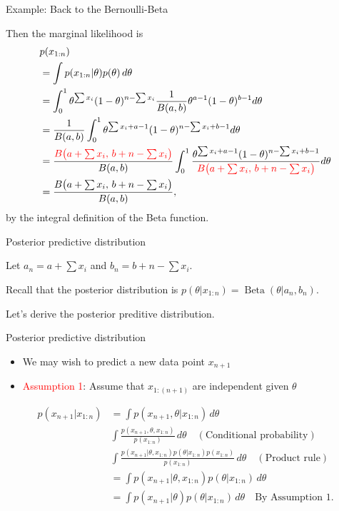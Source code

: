 \documentclass[
  ignorenonframetext,
]{beamer}
\providecommand{\tightlist}{%
  \setlength{\itemsep}{0pt}\setlength{\parskip}{0pt}}
\DeclareMathOperator*{\Beta}{Beta}
\begin{document}
\begin{frame}{Example: Back to the Bernoulli-Beta}
\protect\hypertarget{example-back-to-the-bernoulli-beta-1}{}

Then the marginal likelihood is \[
\begin{aligned}
&p(x_{1:n}) \\
&= \int p(x_{1:n}|\theta) p(\theta) \,d\theta\\
& = \int_0^1\theta^{\sum x_i}(1-\theta)^{n-\sum x_i}\frac{1}{B(a,b)}\theta^{a-1}(1-\theta)^{b-1} d\theta\\
& = \frac{1}{B(a,b)}\int_0^1\theta^{\sum x_i+a-1}(1-\theta)^{n-\sum x_i+b-1} 
d\theta\\
& = \frac{\textcolor{red}{B\big(a +\sum x_i,\, b + n-\sum x_i\big)}}{B(a,b)}\int_0^1 \frac{\theta^{\sum x_i+a-1}(1-\theta)^{n-\sum x_i+b-1}}{\textcolor{red}{B\big(a +\sum x_i,\, b + n-\sum x_i\big)}}
d\theta\\
& =\frac{B\big(a +\sum x_i,\, b + n-\sum x_i\big)}{B(a,b)},
\end{aligned}
\] by the integral definition of the Beta function.

\end{frame}

\begin{frame}{Posterior predictive distribution}
\protect\hypertarget{posterior-predictive-distribution}{}

Let \(a_n = a +\sum x_i\) and \(b_n = b + n-\sum x_i.\)

Recall that the posterior distribution is
\(p(\theta|x_{1:n}) = \Beta(\theta|a_n,b_n).\)

Let's derive the posterior preditive distribution.

\end{frame}

\begin{frame}{Posterior predictive distribution}
\protect\hypertarget{posterior-predictive-distribution-1}{}

\begin{itemize}
\tightlist
\item
  We may wish to predict a new data point \(x_{n+1}\)
\item
  \textcolor{red}{Assumption 1}: Assume that \(x_{1:(n+1)}\) are
  independent given \(\theta\)
\end{itemize}

\[
\begin{aligned}
p(x_{n+1}|x_{1:n}) &= \int p(x_{n+1},\theta|x_{1:n})\,d\theta\\
& \int \frac{p(x_{n+1},\theta, x_{1:n})}{p(x_{1:n})}\,d\theta \quad (\text{Conditional probability})\\
& \int \frac{p(x_{n+1}|\theta,x_{1:n})p(\theta|x_{1:n})p(x_{1:n})}{p(x_{1:n})}\,d\theta \quad (\text{Product rule})\\
&= \int p(x_{n+1}|\theta,x_{1:n}) p(\theta|x_{1:n})\,d\theta \\
& = \int p(x_{n+1}|\theta) p(\theta|x_{1:n})\,d\theta \quad \text{By Assumption 1.}
\end{aligned}
\]

\end{frame}
\end{document}
